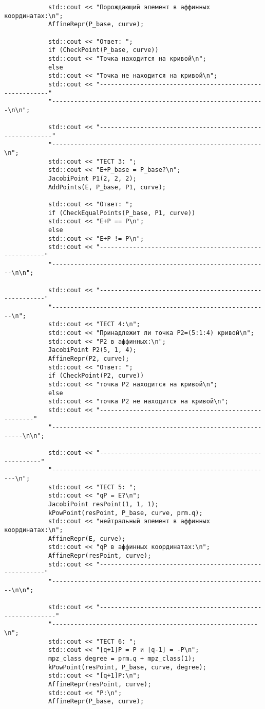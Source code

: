 \documentclass[a4paper,12pt]{article}
\begin{document}
\begin{verbatim}
			std::cout << "Порождающий элемент в аффинных координатах:\n";
			AffineRepr(P_base, curve);
			
			std::cout << "Ответ: ";
			if (CheckPoint(P_base, curve))
			std::cout << "Точка находится на кривой\n";
			else
			std::cout << "Точка не находится на кривой\n";
			std::cout << "--------------------------------------------------------"
			"----------------------------------------------------------\n\n";
			
			std::cout << "---------------------------------------------------------"
			"---------------------------------------------------------\n";
			std::cout << "ТECT 3: ";
			std::cout << "E+P_base = P_base?\n";
			JacobiPoint P1(2, 2, 2);
			AddPoints(E, P_base, P1, curve);
			
			std::cout << "Ответ: ";
			if (CheckEqualPoints(P_base, P1, curve))
			std::cout << "E+P == P\n";
			else
			std::cout << "E+P != P\n";
			std::cout << "-------------------------------------------------------"
			"-----------------------------------------------------------\n\n";
			
			std::cout << "-------------------------------------------------------"
			"-----------------------------------------------------------\n";
			std::cout << "ТECT 4:\n";
			std::cout << "Принадлежит ли точка P2=(5:1:4) кривой\n";
			std::cout << "P2 в аффинных:\n";
			JacobiPoint P2(5, 1, 4);
			AffineRepr(P2, curve);
			std::cout << "Ответ: ";
			if (CheckPoint(P2, curve))
			std::cout << "точка P2 находится на кривой\n";
			else
			std::cout << "точка P2 не находится на кривой\n";
			std::cout << "----------------------------------------------------"
			"--------------------------------------------------------------\n\n";
			
			std::cout << "------------------------------------------------------"
			"------------------------------------------------------------\n";
			std::cout << "ТECT 5: ";
			std::cout << "qP = E?\n";
			JacobiPoint resPoint(1, 1, 1);
			kPowPoint(resPoint, P_base, curve, prm.q);
			std::cout << "нейтральный элемент в аффинных координатах:\n";
			AffineRepr(E, curve);
			std::cout << "qP в аффинных координатах:\n";
			AffineRepr(resPoint, curve);
			std::cout << "-------------------------------------------------------"
			"-----------------------------------------------------------\n\n";
			
			std::cout << "----------------------------------------------------------"
			"--------------------------------------------------------\n";
			std::cout << "ТECT 6: ";
			std::cout << "[q+1]P = P и [q-1] = -P\n";
			mpz_class degree = prm.q + mpz_class(1);
			kPowPoint(resPoint, P_base, curve, degree);
			std::cout << "[q+1]P:\n";
			AffineRepr(resPoint, curve);
			std::cout << "P:\n";
			AffineRepr(P_base, curve);
			

\end{verbatim}
\end{document}
